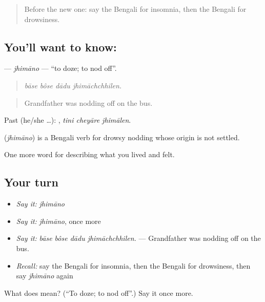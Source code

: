 \begin{quote}
Before the new one: say the Bengali for insomnia, then the Bengali for drowsiness.
\end{quote}

\subsection*{You'll want to know: }
\textbf{} — \emph{jhimāno} — \textquotedblleft{}to doze; to nod off\textquotedblright{}.

\begin{quote}
   
\end{quote}

\begin{quote}
\emph{bāse bôse dādu jhimāchchhilen.}
\end{quote}

\begin{quote}
Grandfather was nodding off on the bus.
\end{quote}

Past (he/she …):   , \emph{tini cheyāre jhimālen}.

\begin{cousinweb}
\textbf{} (\emph{jhimāno}) is a Bengali verb for drowsy nodding whose origin is not settled.
\end{cousinweb}

\begin{grammarlens}[title={What you've built}]
One more word for describing what you lived and felt.
\end{grammarlens}

\subsection*{Your turn}
\begin{itemize}
\raggedright
  \item \emph{Say it:} \emph{jhimāno}
  \item \emph{Say it:} \emph{jhimāno}, once more
  \item \emph{Say it:} \emph{bāse bôse dādu jhimāchchhilen.} — Grandfather was nodding off on the bus.
  \item \emph{Recall:} say the Bengali for insomnia, then the Bengali for drowsiness, then say \emph{jhimāno} again
\end{itemize}

\begin{tcolorbox}[breakable,colback=teal!4,colframe=teal!35!black,title={Before you move on}]
What does  mean? (\textquotedblleft{}To doze; to nod off\textquotedblright{}.) Say it once more.
\end{tcolorbox}

